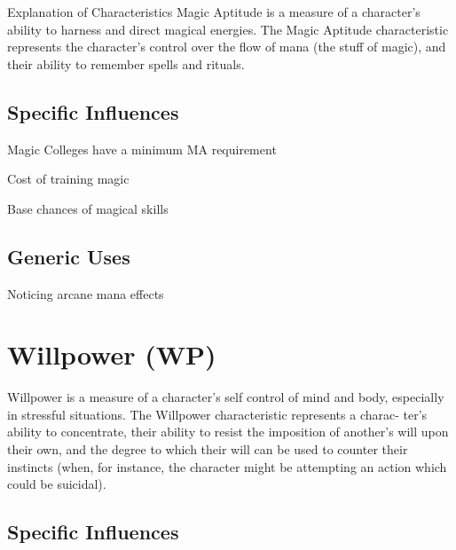 \begin{Chapter}{Explanation of Characteristics}
Magic Aptitude is a measure of a character’s ability to harness and
direct magical energies.  The Magic Aptitude characteristic represents
the character’s control over the flow of mana (the stuff of magic),
and their ability to remember spells and rituals.

\subsection{Specific Influences}

\begin{Itemize}

\item Magic Colleges have a minimum MA requirement

\item Cost of training magic  

\item Base chances of magical skills 

\end{Itemize}

\subsection{Generic Uses}

\begin{Itemize}

\item Noticing arcane mana effects 

\end{Itemize}


\section{Willpower (WP)}

Willpower is a measure of a character’s self control of mind and body,
especially in stressful situations.  The Willpower characteristic
represents a charac- ter’s ability to concentrate, their ability to
resist the imposition of another’s will upon their own, and the degree
to which their will can be used to counter their instincts (when, for
instance, the character might be attempting an action which could be
suicidal).

\subsection{Specific Influences}

\begin{Itemize}


\end{Itemize}
\end{Chapter}
